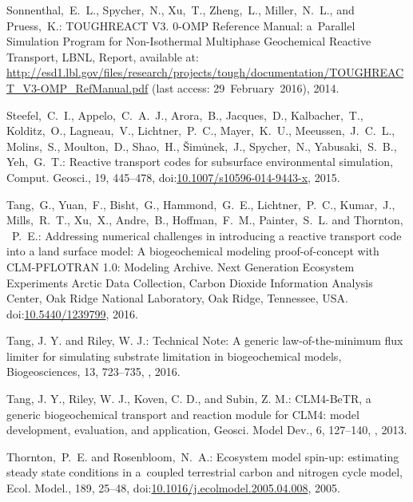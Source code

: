 \documentclass[gmd,noline]{copernicus}
\begin{document}
\begin{thebibliography}{55}
Sonnenthal,~E.~L., Spycher,~N., Xu,~T., Zheng,~L., Miller,~N.~L., and Pruess,~K.:
TOUGHREACT V3. 0-OMP Reference Manual: a~Parallel Simulation Program for Non-Isothermal Multiphase Geochemical Reactive Transport,
LBNL, Report,
available at: \url{http://esd1.lbl.gov/files/research/projects/tough/documentation/TOUGHREACT_V3-OMP_RefManual.pdf} (last access: 29~February~2016),
 2014.



Steefel,~C.~I., Appelo,~C.~A.~J., Arora,~B., Jacques,~D., Kalbacher,~T.,
Kolditz,~O., Lagneau,~V., Lichtner,~P.~C., Mayer,~K.~U., Meeussen,~J.~C.~L.,
Molins,~S., Moulton,~D., Shao,~H., \v{S}im\.{u}nek,~J., Spycher,~N.,
Yabusaki,~S.~B., Yeh,~G.~T.: Reactive transport codes for subsurface
environmental simulation, Comput. Geosci., 19, 445--478,
doi:\href{http://dx.doi.org/10.1007/s10596-014-9443-x}{10.1007/s10596-014-9443-x},
2015.

Tang,~G., Yuan,~F., Bisht,~G., Hammond,~G.~E., Lichtner,~P.~C., Kumar,~J.,
Mills,~R.~T., Xu,~X., Andre,~B., Hoffman,~F.~M., Painter,~S.~L. and Thornton,
~P.~E.: Addressing numerical challenges in introducing a reactive transport
code into a land surface model: A biogeochemical modeling proof-of-concept with
CLM-PFLOTRAN 1.0: Modeling Archive. Next Generation Ecosystem Experiments
Arctic Data Collection, Carbon Dioxide Information Analysis Center, Oak Ridge
National Laboratory, Oak Ridge, Tennessee, USA. 
doi:\href{http://dx.doi.org/10.5440/1239799}{10.5440/1239799}, 2016.

Tang, J. Y. and Riley, W. J.: Technical Note: A generic law-of-the-minimum
flux limiter for simulating substrate limitation in biogeochemical models,
Biogeosciences, 13, 723--735, ,
2016. 


\hack{\newpage}
Tang, J. Y., Riley, W. J., Koven, C. D., and Subin, Z. M.: CLM4-BeTR, a
generic biogeochemical transport and reaction module for CLM4: model
development, evaluation, and application, Geosci. Model Dev., 6, 127--140,
, 2013.



Thornton,~P.~E. and Rosenbloom,~N.~A.:
Ecosystem model spin-up: estimating steady state conditions in a~coupled terrestrial carbon and nitrogen cycle model,
Ecol. Model.,
189, 25--48,
doi:\href{http://dx.doi.org/10.1016/j.ecolmodel.2005.04.008}{10.1016/j.ecolmodel.2005.04.008}, 2005.



\end{thebibliography}
\end{document}
